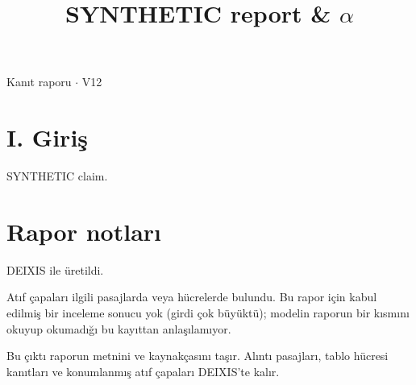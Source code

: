 \documentclass[journal]{IEEEtran}
\begin{document}
\renewcommand{\abstractname}{Özet}
\renewcommand{\IEEEkeywordsname}{Dizin Terimleri}
\renewcommand{\refname}{Kaynaklar}

\title{SYNTHETIC report \& \ensuremath{\alpha}}

\maketitle

\noindent Kanıt raporu \ensuremath{\cdot} V12

\section*{I. Giriş}

SYNTHETIC claim. \cite{Synth26}

\section*{Rapor notları}

DEIXIS ile üretildi.

Atıf çapaları ilgili pasajlarda veya hücrelerde bulundu. Bu rapor için kabul edilmiş bir inceleme sonucu yok (girdi çok büyüktü); modelin raporun bir kısmını okuyup okumadığı bu kayıttan anlaşılamıyor.

Bu çıktı raporun metnini ve kaynakçasını taşır. Alıntı pasajları, tablo hücresi kanıtları ve konumlanmış atıf çapaları DEIXIS'te kalır.




\end{document}
